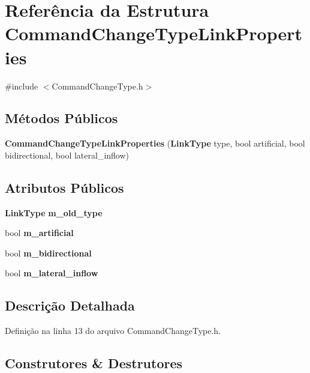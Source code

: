 \section{Referência da Estrutura Command\+Change\+Type\+Link\+Properties}
\label{struct_command_change_type_link_properties}


{\ttfamily \#include $<$Command\+Change\+Type.\+h$>$}

\subsection*{Métodos Públicos}
\begin{DoxyCompactItemize}
\item 
{\bf Command\+Change\+Type\+Link\+Properties} ({\bf Link\+Type} type, bool artificial, bool bidirectional, bool lateral\+\_\+inflow)
\end{DoxyCompactItemize}
\subsection*{Atributos Públicos}
\begin{DoxyCompactItemize}
\item 
{\bf Link\+Type} {\bf m\+\_\+old\+\_\+type}
\item 
bool {\bf m\+\_\+artificial}
\item 
bool {\bf m\+\_\+bidirectional}
\item 
bool {\bf m\+\_\+lateral\+\_\+inflow}
\end{DoxyCompactItemize}


\subsection{Descrição Detalhada}


Definição na linha 13 do arquivo Command\+Change\+Type.\+h.



\subsection{Construtores \& Destrutores}
